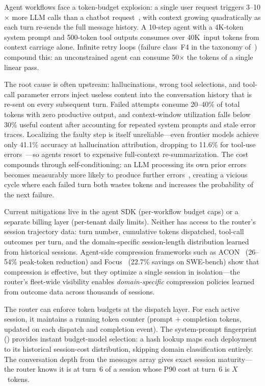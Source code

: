 \begin{opportunity}
\label{opp:token-budget}
Agent workflows face a token-budget explosion: a single user request
triggers 3--10$\times$ more LLM calls than a chatbot
request~\cite{servegen2025}, with context growing quadratically as
each turn re-sends the full message history.  A 10-step agent with a
4K-token system prompt and 500-token tool outputs consumes over
40K~input tokens from context carriage alone.  Infinite retry loops
(failure class~F4 in the taxonomy
of~\cite{agenticfaults2026}) compound this: an unconstrained
agent can consume 50$\times$ the tokens of a single linear pass.

The root cause is often upstream: hallucinations, wrong tool
selections, and tool-call parameter errors inject useless content
into the conversation history that is re-sent on every subsequent
turn.  Failed attempts consume 20--40\% of total tokens with zero
productive output, and context-window utilization falls below 30\%
useful content after accounting for repeated system prompts and stale
error traces.  Localizing the faulty step is itself unreliable---even
frontier models achieve only 41.1\% accuracy at hallucination
attribution, dropping to 11.6\% for tool-use
errors~\cite{agenthallu2026}---so agents resort to expensive
full-context re-summarization.  The cost compounds through
self-conditioning: an LLM processing its own prior errors becomes
measurably more likely to produce further
errors~\cite{driftbench2026}, creating a vicious cycle where each
failed turn both wastes tokens and increases the probability of the
next failure.

Current mitigations live in the agent SDK (per-workflow budget caps)
or a separate billing layer (per-tenant daily limits).  Neither has
access to the router's session trajectory data: turn number,
cumulative tokens dispatched, tool-call outcomes per turn, and the
domain-specific session-length distribution learned from historical
sessions.  Agent-side compression frameworks such as
ACON~\cite{acon2025} (26--54\% peak-token reduction) and
Focus~\cite{focus2026} (22.7\% savings on SWE-bench) show that
compression is effective, but they optimize a single session in
isolation---the router's fleet-wide visibility enables
\emph{domain-specific} compression policies learned from outcome
data across thousands of sessions.

The router can enforce token budgets at the dispatch layer.  For each
active session, it maintains a running token counter (prompt $+$
completion tokens, updated on each dispatch and completion event).
The system-prompt fingerprint ()
provides instant budget-model selection: a hash lookup maps each
deployment to its historical session-cost distribution, skipping
domain classification entirely.  The conversation depth from the
messages array gives exact session maturity---the router knows
it is at turn~6 of a session whose P90 cost at turn~6 is $X$~tokens.


\end{opportunity}
